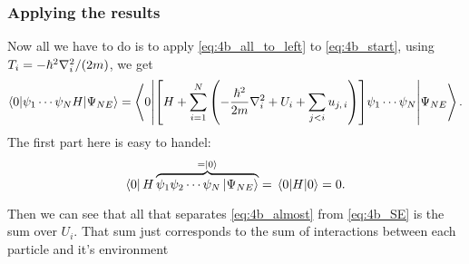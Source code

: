 \documentclass[11pt,letter, swedish, english
]{article}
\begin{document}
\subsubsection{Applying the results}
Now all we have to do is to apply \eqref{eq:4b_all_to_left} to
\eqref{eq:4b_start}, using $T_i=-\hbar^2\laplacian_i/(2m)$, we get
\begin{equation}\label{eq:4b_almost}
\mel**{0}{\psi_1\cdots\psi_{N}H}{\Psi_{NE}}=
\mel**{0}{\qty[H
+\sum_{i=1}^N\qty(-\frac{\hbar^2}{2m}\laplacian_i
+U_i+\sum_{j<i}u_{j,\,i})
]\psi_1\cdots\psi_{N}}{\Psi_{NE}}.
\end{equation}
The first part here is easy to handel:
\begin{equation}
\bra{0} H
\overbrace{\psi_1\psi_2\cdots\psi_{N}\ket{\Psi_{NE}}}^{=\ket{0}}
=\mel{0}{H}{0}=0.
\end{equation}

Then we can see that all that separates \eqref{eq:4b_almost} from
\eqref{eq:4b_SE} is the sum over $U_i$. That sum just corresponds to
the sum of interactions between each particle and it's environment
\end{document}
